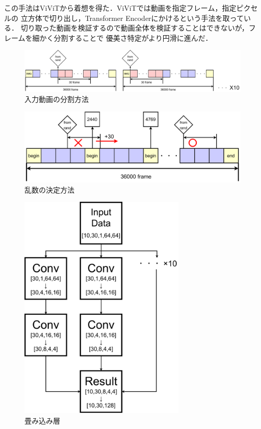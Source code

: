 この手法はViViT\cite{vivit}から着想を得た．ViViTでは動画を指定フレーム，指定ピクセルの
立方体で切り出し，Transformer Encoderにかけるという手法を取っている．
切り取った動画を検証するので動画全体を検証することはできないが，フレームを細かく分割することで
優美さ特定がより円滑に進んだ．

\begin{figure}[b]
  \begin{center}
    \includegraphics[width=120mm]{images/chart/range.pdf}
  \end{center}
  \caption{入力動画の分割方法}
  \label{range}
\end{figure}

\begin{figure}[b]
  \begin{center}
    \includegraphics[width=120mm]{images/chart/decide_rand.pdf}
  \end{center}
  \caption{乱数の決定方法}
  \label{decide_rand}
\end{figure}
\clearpage

\begin{figure}[t]
  \begin{center}
    \includegraphics[width=80mm]{images/chart/conv.pdf}
  \end{center}
  \caption{畳み込み層}
  \label{conv}
\end{figure}

